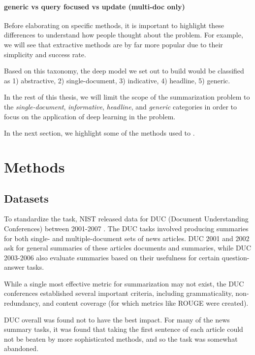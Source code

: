 \documentclass[11pt]{report}
\begin{document}
\paragraph{generic vs query focused vs update (multi-doc only)} %

Before elaborating on specific methods, it is important to highlight these differences to understand how people thought about the problem. For example, we will see that extractive methods are by far more popular due to their simplicity and success rate. 

Based on this taxonomy, the deep model we set out to build would be classified as 1) abstractive, 2) single-document, 3) indicative, 4) headline, 5) generic.

In the rest of this thesis, we will limit the scope of the summarization problem to the \emph{single-document}, \emph{informative}, \emph{headline}, and \emph{generic} categories in order to focus on the application of deep learning in the problem.

In the next section, we highlight some of the methods used to .

\section{Methods}

\subsection{Datasets}

To standardize the task, NIST released data for DUC (Document Understanding Conferences) between 2001-2007 \citep{over2007duc}. The DUC tasks involved producing summaries for both single- and multiple-document sets of news articles. DUC 2001 and 2002 ask for general summaries of these articles documents and summaries, while DUC 2003-2006 also evaluate summaries based on their usefulness for certain question-answer tasks. %

While a single most effective metric for summarization may not exist, the DUC conferences established several important criteria, including grammaticality, non-redundancy, and content coverage (for which metrics like ROUGE \citep{lin2004rouge} were created).

DUC overall was found not to have the best impact. For many of the news summary tasks, it was found that taking the first sentence of each article could not be beaten by more sophisticated methods, and so the task was somewhat abandoned.
\end{document}
